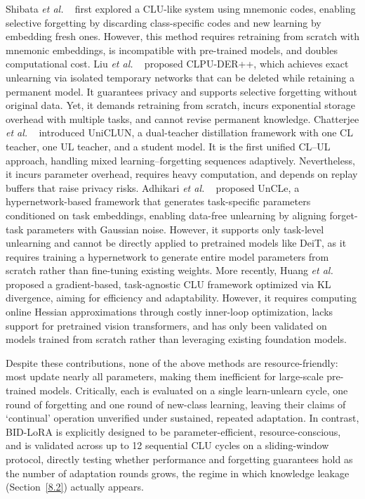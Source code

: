 Shibata \textit{et al.} ~\cite{shibata2021learning} first explored a CLU-like system using mnemonic codes, enabling selective forgetting by discarding class-specific codes and new learning by embedding fresh ones. However, this method requires retraining from scratch with mnemonic embeddings, is incompatible with pre-trained models, and doubles computational cost. Liu \textit{et al.} ~\cite{liu2022continual} proposed CLPU-DER++, which achieves exact unlearning via isolated temporary networks that can be deleted while retaining a permanent model. It guarantees privacy and supports selective forgetting without original data. Yet, it demands retraining from scratch, incurs exponential storage overhead with multiple tasks, and cannot revise permanent knowledge. Chatterjee \textit{et al.} ~\cite{chatterjee2024unified} introduced UniCLUN, a dual-teacher distillation framework with one CL teacher, one UL teacher, and a student model. It is the first unified CL–UL approach, handling mixed learning–forgetting sequences adaptively. Nevertheless, it incurs parameter overhead, requires heavy computation, and depends on replay buffers that raise privacy risks. Adhikari \textit{et al.} ~\cite{adhikari2025unlearning} proposed UnCLe, a hypernetwork-based framework that generates task-specific parameters conditioned on task embeddings, enabling data-free unlearning by aligning forget-task parameters with Gaussian noise. However, it supports only task-level unlearning and cannot be directly applied to pretrained models like DeiT, as it requires training a hypernetwork to generate entire model parameters from scratch rather than fine-tuning existing weights. More recently, Huang \textit{et al.} ~\cite{huang2025unified} proposed a gradient-based, task-agnostic CLU framework optimized via KL divergence, aiming for efficiency and adaptability. However, it requires computing online Hessian approximations through costly inner-loop optimization, lacks support for pretrained vision transformers, and has only been validated on models trained from scratch rather than leveraging existing foundation models.

Despite these contributions, none of the above methods are resource-friendly: most update nearly all parameters, making them inefficient for large-scale pre-trained models. Critically, each is evaluated on a single learn-unlearn cycle, one round of forgetting and one round of new-class learning, leaving their claims of `continual' operation unverified under sustained, repeated adaptation. In contrast, BID-LoRA is explicitly designed to be parameter-efficient, resource-conscious, and is validated across up to 12 sequential CLU cycles on a sliding-window protocol, directly testing whether performance and forgetting guarantees hold as the number of adaptation rounds grows, the regime in which knowledge leakage (Section~\ref{8.2}) actually appears.